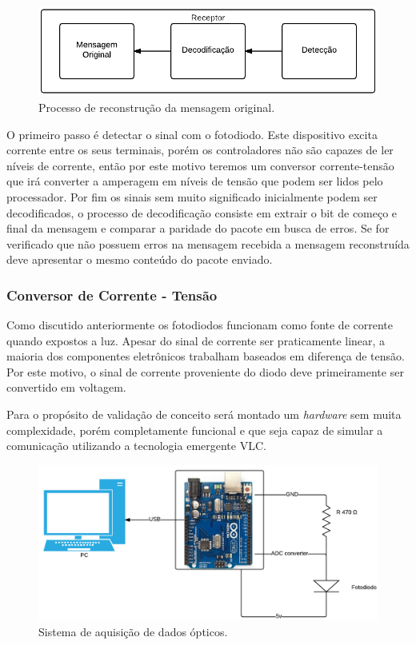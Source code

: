  \begin{figure}
	\centering
		\includegraphics[width = 12cm]{figuras/diagrama_recepcao}
	\caption{Processo de reconstrução da mensagem original.}
	\label{Fig: recepcao}
\end{figure}

O primeiro passo é detectar o sinal com o fotodiodo. Este dispositivo excita corrente entre os seus terminais, porém os controladores não são capazes de ler níveis de corrente, então por este motivo teremos um conversor corrente-tensão que irá converter a amperagem em níveis de tensão que podem ser lidos pelo processador. Por fim os sinais sem muito significado inicialmente podem ser decodificados, o processo de decodificação consiste em extrair o bit de começo e final da mensagem e comparar a paridade do pacote em busca de erros. Se for verificado que não possuem erros na mensagem recebida a mensagem reconstruída deve apresentar o mesmo conteúdo do pacote enviado.

\subsubsection{Conversor de Corrente - Tensão}

Como discutido anteriormente os fotodiodos funcionam como fonte de corrente quando expostos a luz. Apesar do sinal de corrente ser praticamente linear, a maioria dos componentes eletrônicos trabalham baseados em diferença de tensão. Por este motivo, o sinal de corrente proveniente do diodo deve primeiramente ser convertido em voltagem. 

Para o propósito de validação de conceito será montado um \textit{hardware} sem muita complexidade, porém completamente funcional e que seja capaz de simular a comunicação utilizando a tecnologia emergente VLC.

\begin{figure}
	\centering
		\includegraphics[keepaspectratio=true scale=0.3]{figuras/sistema_recepcao}
	\caption{Sistema de aquisição de dados ópticos.}
	\label{Fig: Aquisição de dados ópticos}
\end{figure}


